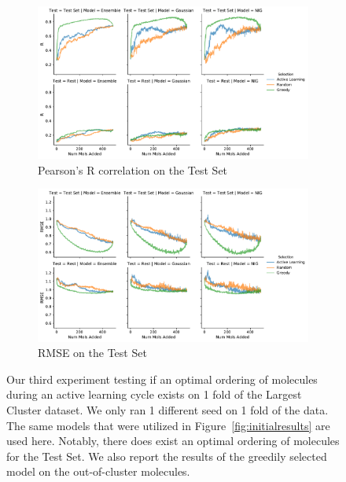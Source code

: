 \documentclass[journal=jmcmar,manuscript=article]{achemso}
\begin{document}
\begin{figure}[tbph]
    \centering
    \begin{subfigure}[b]{0.98\textwidth}
        \includegraphics[width=1\linewidth]{figures/fig4_lc_withgreed_R.pdf}
        \caption{Pearson's R correlation on the Test Set}
    \end{subfigure}%
    
    \begin{subfigure}[b]{0.98\textwidth}
        \includegraphics[width=1\linewidth]{figures/fig4_lc_withgreed_RMSE.pdf}
        \caption{RMSE on the Test Set}
    \end{subfigure}
    \caption{Our third experiment testing if an optimal ordering of molecules during an active learning cycle exists on 1 fold of the Largest Cluster dataset. We only ran 1 different seed on 1 fold of the data. The same models that were utilized in Figure~\ref{fig:initialresults} are used here. Notably, there does exist an optimal ordering of molecules for the Test Set. We also report the results of the greedily selected model on the out-of-cluster molecules.}
    \label{fig:lcgreed}
\end{figure}
\end{document}
